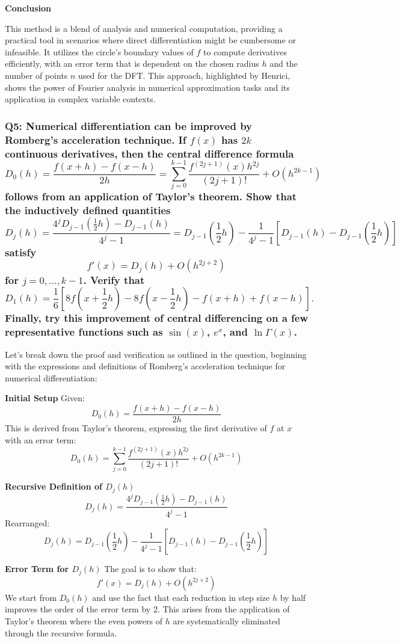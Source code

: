 \documentclass[8pt]{article}
\begin{document}
\textbf{Conclusion}

This method is a blend of analysis and numerical computation, providing a practical tool in scenarios where direct differentiation might be cumbersome or infeasible. It utilizes the circle's boundary values of \( f \) to compute derivatives efficiently, with an error term that is dependent on the chosen radius \( h \) and the number of points \( n \) used for the DFT. This approach, highlighted by Henrici, shows the power of Fourier analysis in numerical approximation tasks and its application in complex variable contexts.

\subsubsection*{Q5: Numerical differentiation can be improved by Romberg’s acceleration technique. If \( f(x) \) has \( 2k \) continuous derivatives, then the central difference formula
\[
D_0(h) = \frac{f(x+h) - f(x-h)}{2h} = \sum_{j=0}^{k-1} \frac{f^{(2j+1)}(x) h^{2j}}{(2j+1)!} + O(h^{2k-1})
\]
follows from an application of Taylor’s theorem. Show that the inductively defined quantities
\[
D_j(h) = \frac{4^j D_{j-1}(\frac{1}{2}h) - D_{j-1}(h)}{4^j - 1} = D_{j-1}(\frac{1}{2}h) - \frac{1}{4^j - 1} \left[D_{j-1}(h) - D_{j-1}(\frac{1}{2}h)\right]
\]
satisfy
\[
f'(x) = D_j(h) + O(h^{2j+2})
\]
for \( j = 0, \ldots, k-1 \). Verify that
\[
D_1(h) = \frac{1}{6} \left[ 8f(x+\frac{1}{2}h) - 8f(x-\frac{1}{2}h) - f(x+h) + f(x-h) \right].
\]
Finally, try this improvement of central differencing on a few representative functions such as \( \sin(x) \), \( e^x \), and \( \ln \Gamma(x) \).}

Let's break down the proof and verification as outlined in the question, beginning with the expressions and definitions of Romberg's acceleration technique for numerical differentiation:

\textbf{Initial Setup}
Given:
\[ D_0(h) = \frac{f(x+h) - f(x-h)}{2h} \]
This is derived from Taylor's theorem, expressing the first derivative of \( f \) at \( x \) with an error term:
\[ D_0(h) = \sum_{j=0}^{k-1} \frac{f^{(2j+1)}(x) h^{2j}}{(2j+1)!} + O(h^{2k-1}) \]

\textbf{Recursive Definition of \( D_j(h) \)}
\[ D_j(h) = \frac{4^j D_{j-1}(\frac{1}{2}h) - D_{j-1}(h)}{4^j - 1} \]
Rearranged:
\[ D_j(h) = D_{j-1}(\frac{1}{2}h) - \frac{1}{4^j - 1} \left[D_{j-1}(h) - D_{j-1}(\frac{1}{2}h)\right] \]

\textbf{Error Term for \( D_j(h) \)}
The goal is to show that:
\[ f'(x) = D_j(h) + O(h^{2j+2}) \]
We start from \( D_0(h) \) and use the fact that each reduction in step size \( h \) by half improves the order of the error term by 2. This arises from the application of Taylor’s theorem where the even powers of \( h \) are systematically eliminated through the recursive formula.
\end{document}
